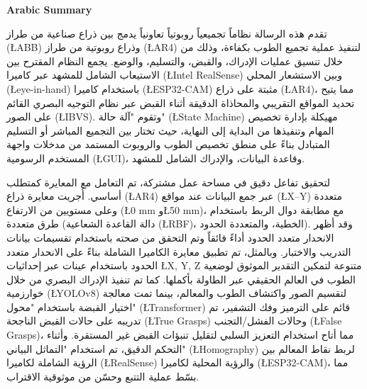 \clearpage
\thispagestyle{fancy}
\begin{center}
    {\Large \textbf{Arabic Summary}} 
\end{center}

\setlength{\parskip}{1em}

\begin{arabtext}
تقدم هذه الرسالة نظاماً تجميعياً روبوتياً تعاونياً يدمج بين ذراع صناعية من طراز (\L{ABB}) وذراع روبوتية من طراز (\L{AR4}) لتنفيذ عملية تجميع الطوب بكفاءة، وذلك من خلال تنسيق عمليات الإدراك، والقبض، والتسليم، والوضع. يجمع النظام المقترح بين الاستيعاب الشامل للمشهد عبر كاميرا (\L{Intel RealSense}) وبين الاستشعار المحلي (\L{eye-in-hand}) باستخدام كاميرا (\L{ESP32-CAM}) مثبتة على ذراع (\L{AR4})، مما يتيح تحديد المواقع التقريبي والمحاذاة الدقيقة أثناء القبض عبر نظام التوجيه البصري القائم على الصور (\L{IBVS}). وتقوم "آلة حالة" (\L{State Machine}) مهيكلة بإدارة تخصيص المهام وتنفيذها من البداية إلى النهاية، حيث تختار بين التجميع المباشر أو التسليم المتبادل بناءً على منطق تخصيص الطوب والروبوت المستمد من مدخلات واجهة المستخدم الرسومية (\L{GUI})، وقاعدة البيانات، والإدراك الشامل للمشهد.

لتحقيق تفاعل دقيق في مساحة عمل مشتركة، تم التعامل مع المعايرة كمتطلب أساسي. أُجريت معايرة ذراع (\L{AR4}) عبر جمع البيانات عند مواقع (\L{X--Y}) متعددة وعلى مستويين من الارتفاع (\L{0 mm} و\L{50 mm})، مع مطابقة دوال الربط باستخدام طرق متعددة (دالة القاعدة الشعاعية (\L{RBF})، الخطية، والمتعددة الحدود). وقد أظهر الانحدار متعدد الحدود أداءً فائقاً وتم التحقق من صحته باستخدام تقسيمات بيانات التدريب والاختبار. وبالمثل، تم تطبيق معايرة الكاميرا الشاملة بناءً على الانحدار متعدد الحدود باستخدام عينات عبر إحداثيات \L{X, Y, Z} متنوعة لتمكين التقدير الموثوق لوضعية الطوب في العالم الحقيقي عبر الطاولة بأكملها. كما تم تنفيذ الإدراك البصري من خلال خوارزمية (\L{YOLOv8}) لتقسيم الصور واكتشاف الطوب والمعالم، بينما تمت معالجة اختيار القبضة باستخدام "محول" (\L{Transformer}) قائم على الترميز وفك التشفير، تم تدريبه على حالات القبض الناجحة (\L{True Grasps}) وحالات الفشل/التجنب (\L{False Grasps})، مما أتاح استخدام التعزيز السلبي لتقليل تنبؤات القبض غير المستقرة. وأثناء التحكم الدقيق، تم استخدام "التماثل البياني" (\L{Homography}) لربط نقاط المعالم بين الرؤية الشاملة لكاميرا (\L{RealSense}) والرؤية المحلية لكاميرا (\L{ESP32-CAM})، مما بسّط عملية التتبع وحسّن من موثوقية الاقتراب.
\end{arabtext}